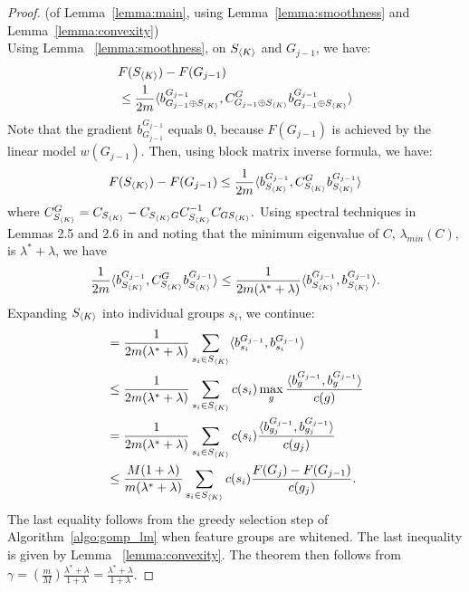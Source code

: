\begin{proof} (of Lemma~\ref{lemma:main}, using Lemma~\ref{lemma:smoothness} and Lemma~\ref{lemma:convexity}) \\
  Using Lemma ~\ref{lemma:smoothness}, on $S_{\langle K \rangle}$ and $G_{j-1}$, we have: 
  \begin{align}
    &F(S_{\langle K \rangle}) - F(G_{j-1})  \notag \\
    &\leq 
      \frac{1}{2m} \langle b^{G_{j-1}}_{G_{j-1} \oplus S_{\langle K \rangle}},
      C^G_{G_{j-1} \oplus S_{\langle K \rangle}} b^{G_{j-1}}_{G_{j-1} \oplus S_{\langle K \rangle}} \rangle
  \end{align}
  Note that the gradient $b_{G_{j-1}}^{G_{j-1}}$  
  		equals $0$, because $F(G_{j-1})$ is achieved by  
  		the linear model $w(G_{j-1})$. Then, using block matrix inverse
  formula, we have:
  \begin{align}
    F(S_{\langle K \rangle}) - F(G_{j-1}) \leq 
      \frac{1}{2m} 
      \langle b^{G_{j-1}}_{S_{\langle K \rangle}},
      C^G_{S_{\langle K \rangle}} 
      b^{G_{j-1}}_{S_{\langle K \rangle}} \rangle
  \end{align}
  where $
    C^G_{S_{\langle K \rangle}} = C_{S_{\langle K \rangle}} - C_{{S_{\langle K \rangle}}G} 
      C^{-1}_{S_{\langle K \rangle}} C_{G{S_{\langle K \rangle}}}.  $
  Using spectral techniques in Lemmas 2.5 and 2.6 in \citep{kemp} and
  noting that the minimum eigenvalue of $C$, $\lambda_{min}(C)$, is $\lambda^* + \lambda$, we have
  \begin{align}
      \frac{1}{2m} 
      \langle b^{G_{j-1}}_{S_{\langle K \rangle}}, 
      C^G_{S_{\langle K \rangle}} 
      b^{G_{j-1}}_{S_{\langle K \rangle}} \rangle
    \leq 
      \frac{1}{2m (\lambda^* + \lambda)} 
     \langle b^{G_{j-1}}_{S_{\langle K \rangle}}, 
      b^{G_{j-1}}_{S_{\langle K \rangle}} \rangle.
  \end{align}
  Expanding $S_{\langle K \rangle}$ into individual groups $s_i$, we continue:
  \begin{align}
    &= 
    	\frac{1}{2m(\lambda^* + \lambda)} \sum _{s_i \in S_{\langle K \rangle}} 
       \langle b^{G_{j-1}}_{s_i}, {b^{G_{j-1}}_{s_i}} \rangle  \\
    &\leq
        \frac{1}{2m(\lambda^* + \lambda)} \sum _{s_i \in S_{\langle K \rangle}} 
        c(s_i) \max_{g} \frac{  \langle b^{G_{j-1}}_{g}, {b^{G_{j-1}}_{g}} \rangle}{c(g)} \\
    &=
        \frac{1}{2m(\lambda^* + \lambda)} \sum _{s_i \in S_{\langle K \rangle}} 
        c(s_i) \frac{\langle b^{G_{j-1}}_{g_j}, {b^{G_{j-1}}_{g_j}} \rangle}{c(g_j)} \\
    &\leq
        \frac{ M(1+ \lambda)}{m (\lambda^* + \lambda)} \sum _{s_i \in S_{\langle K \rangle}} 
        c(s_i)
          \frac{ F(G_{j}) - F(G_{j-1}) } { c(g_j) }.
  \end{align}
  The last equality follows from the greedy selection step of Algorithm~\ref{algo:gomp_lm} when feature groups are whitened. 
  The last inequality is given by Lemma ~\ref{lemma:convexity}. The 
  theorem then follows from $\gamma = (\frac{m}{M}) \frac{\lambda^* + \lambda}{1+\lambda} = \frac{\lambda^* + \lambda}{1+\lambda}$. 
\end{proof}




